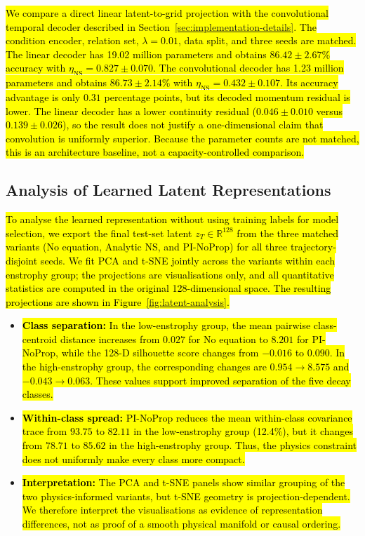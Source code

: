 \documentclass[preprint,12pt]{elsarticle}
\newcommand{\rev}[1]{\hl{#1}}
\begin{document}
\rev{We compare a direct linear latent-to-grid projection with the convolutional temporal decoder described in Section~\ref{sec:implementation-details}. The condition encoder, relation set, $\lambda=0.01$, data split, and three seeds are matched. The linear decoder has 19.02 million parameters and obtains $86.42\pm2.67\%$ accuracy with $\eta_{\mathrm{NS}}=0.827\pm0.070$. The convolutional decoder has 1.23 million parameters and obtains $86.73\pm2.14\%$ with $\eta_{\mathrm{NS}}=0.432\pm0.107$. Its accuracy advantage is only $0.31$ percentage points, but its decoded momentum residual is lower. The linear decoder has a lower continuity residual ($0.046\pm0.010$ versus $0.139\pm0.026$), so the result does not justify a one-dimensional claim that convolution is uniformly superior. Because the parameter counts are not matched, this is an architecture baseline, not a capacity-controlled comparison.}

\subsection{Analysis of Learned Latent Representations}
\label{sec:representation-analysis}

\rev{To analyse the learned representation without using training labels for model selection, we export the final test-set latent $z_T\in\mathbb{R}^{128}$ from the three matched variants (No equation, Analytic NS, and PI-NoProp) for all three trajectory-disjoint seeds. We fit PCA and t-SNE jointly across the variants within each enstrophy group; the projections are visualisations only, and all quantitative statistics are computed in the original 128-dimensional space. The resulting projections are shown in Figure~\ref{fig:latent-analysis}.}

\begin{itemize}
    \item \rev{\textbf{Class separation:} In the low-enstrophy group, the mean pairwise class-centroid distance increases from $0.027$ for No equation to $8.201$ for PI-NoProp, while the 128-D silhouette score changes from $-0.016$ to $0.090$. In the high-enstrophy group, the corresponding changes are $0.954\rightarrow8.575$ and $-0.043\rightarrow0.063$. These values support improved separation of the five decay classes.}
    \item \rev{\textbf{Within-class spread:} PI-NoProp reduces the mean within-class covariance trace from $93.75$ to $82.11$ in the low-enstrophy group (12.4\%), but it changes from $78.71$ to $85.62$ in the high-enstrophy group. Thus, the physics constraint does not uniformly make every class more compact.}
    \item \rev{\textbf{Interpretation:} The PCA and t-SNE panels show similar grouping of the two physics-informed variants, but t-SNE geometry is projection-dependent. We therefore interpret the visualisations as evidence of representation differences, not as proof of a smooth physical manifold or causal ordering.}
\end{itemize}
\end{document}
